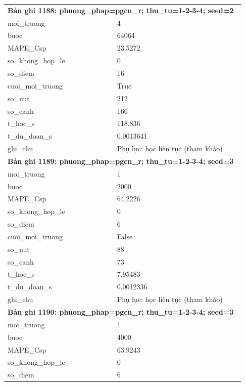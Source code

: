 \begin{longtable}{p{0.43\linewidth}p{0.50\linewidth}}
\midrule
\multicolumn{2}{p{0.95\linewidth}}{\textbf{Bản ghi 1188: phuong\_phap=pgcn\_r; thu\_tu=1-2-3-4; seed=2}} \\
moi\_\allowbreak truong & 4 \\
buoc & 64064 \\
MAPE\_\allowbreak Csp & 23.5272 \\
so\_\allowbreak khong\_\allowbreak hop\_\allowbreak le & 0 \\
so\_\allowbreak diem & 16 \\
cuoi\_\allowbreak moi\_\allowbreak truong & True \\
so\_\allowbreak nut & 212 \\
so\_\allowbreak canh & 166 \\
t\_\allowbreak hoc\_\allowbreak s & 118.836 \\
t\_\allowbreak du\_\allowbreak doan\_\allowbreak s & 0.0013641 \\
ghi\_\allowbreak chu & Phụ lục: học liên tục (tham khảo) \\
\midrule
\multicolumn{2}{p{0.95\linewidth}}{\textbf{Bản ghi 1189: phuong\_phap=pgcn\_r; thu\_tu=1-2-3-4; seed=3}} \\
moi\_\allowbreak truong & 1 \\
buoc & 2000 \\
MAPE\_\allowbreak Csp & 64.2226 \\
so\_\allowbreak khong\_\allowbreak hop\_\allowbreak le & 0 \\
so\_\allowbreak diem & 6 \\
cuoi\_\allowbreak moi\_\allowbreak truong & False \\
so\_\allowbreak nut & 88 \\
so\_\allowbreak canh & 73 \\
t\_\allowbreak hoc\_\allowbreak s & 7.95483 \\
t\_\allowbreak du\_\allowbreak doan\_\allowbreak s & 0.0012336 \\
ghi\_\allowbreak chu & Phụ lục: học liên tục (tham khảo) \\
\midrule
\multicolumn{2}{p{0.95\linewidth}}{\textbf{Bản ghi 1190: phuong\_phap=pgcn\_r; thu\_tu=1-2-3-4; seed=3}} \\
moi\_\allowbreak truong & 1 \\
buoc & 4000 \\
MAPE\_\allowbreak Csp & 63.9243 \\
so\_\allowbreak khong\_\allowbreak hop\_\allowbreak le & 0 \\
so\_\allowbreak diem & 6 \\

\end{longtable}
